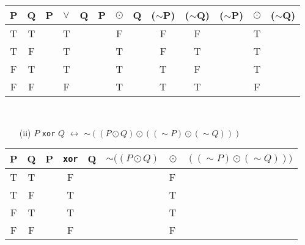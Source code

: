 \documentclass[12pt,a4paper]{article}
\theoremstyle{plain}
\theoremstyle{definition}
\begin{document}
\begin{itemize}
\begin{enumerate}
        \begin{tabular}{|c|c|lcl|ccc|c|c|lcl|}
                \multicolumn{1}{|l|}{P} & \multicolumn{1}{l|}{Q} & P & \multicolumn{1}{l}{$\lor$} & Q & \multicolumn{1}{l}{P} & \multicolumn{1}{l}{$\odot$} & \multicolumn{1}{l|}{Q} & \multicolumn{1}{l|}{($\sim$P)} & \multicolumn{1}{l|}{($\sim$Q)} & ($\sim$P) & \multicolumn{1}{l}{$\odot$} & ($\sim$Q) \\ \hline
                T                       & T                      &   & T                      &   &                       & F                        &                        & F                          & F                          &       & T                        &       \\
                T                       & F                      &   & T                      &   &                       & T                        &                        & F                          & T                          &       & T                        &       \\
                F                       & T                      &   & T                      &   &                       & T                        &                        & T                          & F                          &       & T                        &       \\
                F                       & F                      &   & F                      &   &                       & T                        &                        & T                          & T                          &       & F                        &      
        \end{tabular} \\

    \begin{itemize}
        \item[ (ii)] 
        $P$ \texttt{xor} $Q$ $\leftrightarrow$ $\sim((P\odot Q)\odot ((\sim P)\odot(\sim Q)))$\\
    \end{itemize}

    \begin{tabular}{|c|c|lcl|cll|}
        \multicolumn{1}{|l|}{P} & \multicolumn{1}{l|}{Q} & P & \multicolumn{1}{l}{\texttt{xor}} & Q & $\sim((P\odot Q)$ & $\odot$ & $((\sim P)\odot(\sim Q)))$ \\ \hline
        T                       & T                      &   & F                       &   &                & F    &                       \\
        T                       & F                      &   & T                       &   &                & T    &                       \\
        F                       & T                      &   & T                       &   &                & T    &                       \\
        F                       & F                      &   & F                       &   &                & F    &                      
        \end{tabular} \\


\end{enumerate}
\end{itemize}
\end{document}
